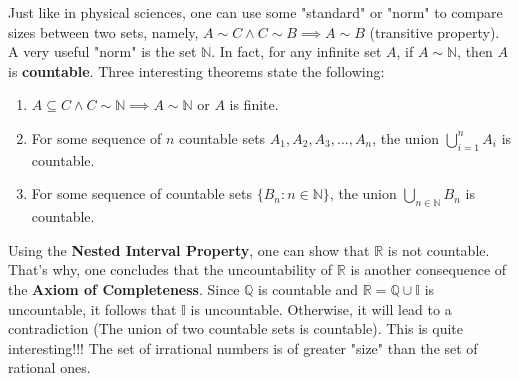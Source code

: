 \documentclass[12pt]{article}
\newcommand{\N}{\mathbb{N}}
\newcommand{\R}{\mathbb{R}}
\newcommand{\Q}{\mathbb{Q}}
\begin{document}
	 Just like in physical sciences, one can use some "standard" or "norm" to compare sizes between two sets, namely, $A\sim C \wedge C\sim B \implies A\sim B$ (transitive property). A very useful "norm" is the set $\N$. In fact, for any infinite set $A$, if $A\sim \N$, then $A$ is \textbf{countable}. Three interesting theorems state the following:
	 \begin{enumerate}[label=(\alph*)]
	 	\item $A\subseteq C \wedge C\sim \N \implies A\sim \N $ or $A$ is finite.  
	 	\item For some sequence of $n$ countable sets $A_{1}, A_{2}, A_{3},\ldots, A_{n}$, the union $\bigcup_{i=1}^{n} A_{i}$ is countable.
	 	\item For some sequence of countable sets $\{B_{n}:n\in \N\}$, the union $\bigcup_{n\in \N} B_{n}$ is countable.
	 \end{enumerate}
 	Using the \textbf{Nested Interval Property}, one can show that $\R$ is not countable. That's why, one concludes that the uncountability of $\R$ is another consequence of the \textbf{Axiom of Completeness}. Since $\Q$ is countable and $\R = \Q\cup \mathbb{I}$ is uncountable, it follows that $\mathbb{I}$ is uncountable. Otherwise, it will lead to a contradiction (The union of two countable sets is countable). This is quite interesting!!! The set of irrational numbers is of greater "size" than the set of rational ones.  
	
\end{document}
